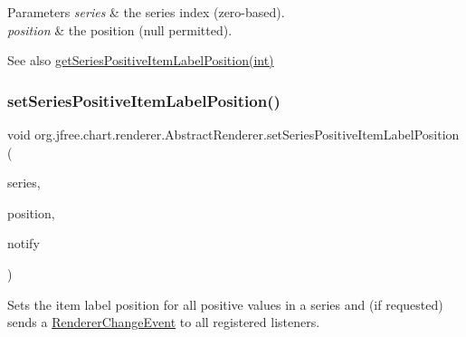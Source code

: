 \begin{DoxyParams}{Parameters}
{\em series} & the series index (zero-\/based). \\
\hline
{\em position} & the position ({\ttfamily null} permitted).\\
\hline
\end{DoxyParams}
\begin{DoxySeeAlso}{See also}
\mbox{\hyperlink{classorg_1_1jfree_1_1chart_1_1renderer_1_1_abstract_renderer_aeeec0341e079d624ac0a0984fbe83ceb}{get\+Series\+Positive\+Item\+Label\+Position(int)}} 
\end{DoxySeeAlso}
\mbox{\label{classorg_1_1jfree_1_1chart_1_1renderer_1_1_abstract_renderer_adee2d21993977ecf28eee1f4968bb222}} 
\subsubsection{\texorpdfstring{set\+Series\+Positive\+Item\+Label\+Position()}{setSeriesPositiveItemLabelPosition()}\hspace{0.1cm}{\footnotesize\ttfamily [2/2]}}
{\footnotesize\ttfamily void org.\+jfree.\+chart.\+renderer.\+Abstract\+Renderer.\+set\+Series\+Positive\+Item\+Label\+Position (\begin{DoxyParamCaption}\item[{int}]{series,  }\item[{\mbox{\hyperlink{classorg_1_1jfree_1_1chart_1_1labels_1_1_item_label_position}{Item\+Label\+Position}}}]{position,  }\item[{boolean}]{notify }\end{DoxyParamCaption})}

Sets the item label position for all positive values in a series and (if requested) sends a \mbox{\hyperlink{}{Renderer\+Change\+Event}} to all registered listeners.


